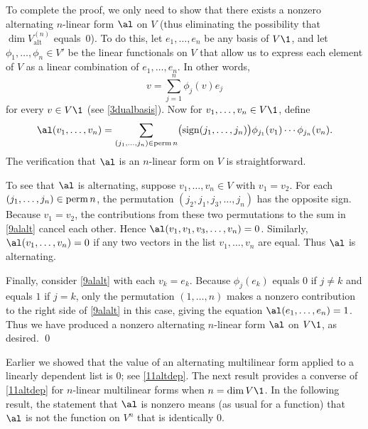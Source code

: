 To complete the proof, we only need to show that there exists a nonzero alternating $n$-linear form $\al$ on $V$ \big(thus eliminating the possibility that $\dim V^{(n)}_{\text{alt}}$ equals~$0$\big). To do this, let $e_1, \ldots, e_n$ be any basis of $V\1$, and let $\phi_1, \ldots, \phi_n \in V'$ be the linear functionals on $V$ that allow us to express each element of $V$ as a linear combination of $e_1, \ldots, e_n$. In other words,
\[
v = \sum_{j=1}^n \phi_j(v) e_j
\]
for every $v \in V\1$ (see \ref{3dualbasis}). Now for $v_1, \ldots, v_n \in V\1$, define
\begin{equation} \label{9alalt}
\al(v_1, \ldots, v_n) =
\sum_{(j_1, \ldots, j_n) \in \perm n} \paren[\big]{ \sign(j_1, \ldots, j_n) } \phi_{j_1}(v_1) \cdots \phi_{j_n}(v_n).
\end{equation}%
The verification that $\al$ is an $n$-linear form on $V$ is straightforward.

To see that $\al$ is alternating, suppose $v_1, \ldots, v_n \in V$ with $v_1 = v_2$.
For each $(j_1, \ldots, j_n) \in \operatorname{perm} n$, the permutation $(j_2, j_1, j_3, \ldots, j_n)$ has the opposite sign.
Because $v_1 = v_2$, the contributions from these two permutations to the sum in \ref{9alalt} cancel each other. Hence $\al(v_1, v_1, v_3, \ldots, v_n) = 0$. Similarly, $\al(v_1, \ldots, v_n) = 0$ if any two vectors in the list $v_1, \ldots, v_n$ are equal. Thus $\al$ is alternating.

Finally, consider \ref{9alalt} with each $v_k = e_k$. Because $\phi_j(e_k)$ equals $0$ if $j \ne k$ and equals $1$ if $j = k$, only the permutation $(1, \ldots, n)$ makes a nonzero contribution to the right side of \ref{9alalt} in this case, giving the equation $\al(e_1, \ldots, e_n) =1$. Thus we have produced a nonzero alternating $n$-linear form $\al$ on $V\1$, as desired.
\qed

\pagebreak[3]


Earlier we showed that the value of an alternating multilinear form applied to a linearly dependent list is $0$; see \ref{11altdep}. The next result provides a converse of \ref{11altdep} for $n$-linear multilinear forms when $n = \dim V\1$. In the following result, the statement that $\al$ is nonzero means (as usual for a function) that $\al$ is not the function on $V^n$ that is identically $0$.

